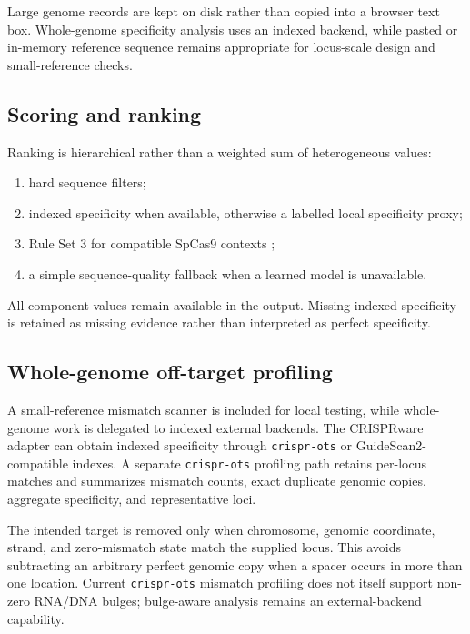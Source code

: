 \documentclass[11pt]{article}
\begin{document}
Large genome records are kept on disk rather than copied into a browser text box. Whole-genome specificity analysis uses an indexed backend, while pasted or in-memory reference sequence remains appropriate for locus-scale design and small-reference checks.

\subsection{Scoring and ranking}

Ranking is hierarchical rather than a weighted sum of heterogeneous values:

\begin{enumerate}[leftmargin=*]
\item hard sequence filters;
\item indexed specificity when available, otherwise a labelled local specificity proxy;
\item Rule Set 3 for compatible SpCas9 contexts \citep{deweirdt2022rs3};
\item a simple sequence-quality fallback when a learned model is unavailable.
\end{enumerate}

All component values remain available in the output. Missing indexed specificity is retained as missing evidence rather than interpreted as perfect specificity.

\subsection{Whole-genome off-target profiling}

A small-reference mismatch scanner is included for local testing, while whole-genome work is delegated to indexed external backends. The CRISPRware adapter can obtain indexed specificity through \texttt{crispr-ots} or GuideScan2-compatible indexes. A separate \texttt{crispr-ots} profiling path retains per-locus matches and summarizes mismatch counts, exact duplicate genomic copies, aggregate specificity, and representative loci.

The intended target is removed only when chromosome, genomic coordinate, strand, and zero-mismatch state match the supplied locus. This avoids subtracting an arbitrary perfect genomic copy when a spacer occurs in more than one location. Current \texttt{crispr-ots} mismatch profiling does not itself support non-zero RNA/DNA bulges; bulge-aware analysis remains an external-backend capability.
\end{document}
